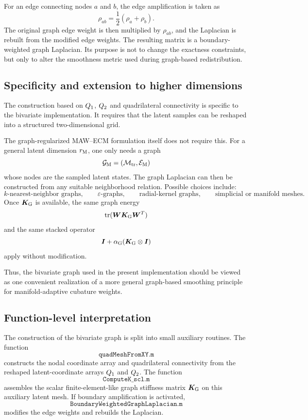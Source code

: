 \documentclass[11pt,a4paper]{article}
\begin{document}
For an edge connecting nodes $a$ and $b$, the edge amplification is taken as
\[
        \rho_{ab}
        =
        \frac{1}{2}(\rho_a+\rho_b).
\]
The original graph edge weight is then multiplied by $\rho_{ab}$, and the
Laplacian is rebuilt from the modified edge weights. The resulting matrix is a
boundary-weighted graph Laplacian. Its purpose is not to change the exactness
constraints, but only to alter the smoothness metric used during graph-based
redistribution.

\subsection{Specificity and extension to higher dimensions}

The construction based on $Q_1$, $Q_2$ and quadrilateral connectivity is
specific to the bivariate implementation. It requires that the latent samples
can be reshaped into a structured two-dimensional grid.

The graph-regularized MAW--ECM formulation itself does not require this. For a
general latent dimension $r_{\mathrm{M}}$, one only needs a graph
\[
        \mathcal{G}_{\mathrm{M}}=(\mathcal{M}_{\mathrm{tr}},\mathcal{E}_{\mathrm{M}})
\]
whose nodes are the sampled latent states. The graph Laplacian can then be
constructed from any suitable neighborhood relation. Possible choices include:
\[
        k\text{-nearest-neighbor graphs},\qquad
        \varepsilon\text{-graphs},\qquad
        \text{radial-kernel graphs},\qquad
        \text{simplicial or manifold meshes}.
\]
Once $\bm K_{\mathrm{G}}$ is available, the same graph energy
\[
        \operatorname{tr}(\bm W\bm K_{\mathrm{G}}\bm W^T)
\]
and the same stacked operator
\[
        \bm I+\alpha_{\mathrm{G}}(\bm K_{\mathrm{G}}\otimes\bm I)
\]
apply without modification.

Thus, the bivariate graph used in the present implementation should be viewed
as one convenient realization of a more general graph-based smoothing principle
for manifold-adaptive cubature weights.

\subsection{Function-level interpretation}

The construction of the bivariate graph is split into small auxiliary routines.
The function
\[
        \texttt{quadMeshFromXY.m}
\]
constructs the nodal coordinate array and quadrilateral connectivity from the
reshaped latent-coordinate arrays $Q_1$ and $Q_2$. The function
\[
        \texttt{ComputeK\_scl.m}
\]
assembles the scalar finite-element-like graph stiffness matrix $\bm K_{\mathrm{G}}$ on
this auxiliary latent mesh. If boundary amplification is activated,
\[
        \texttt{BoundaryWeightedGraphLaplacian.m}
\]
modifies the edge weights and rebuilds the Laplacian.
\end{document}
